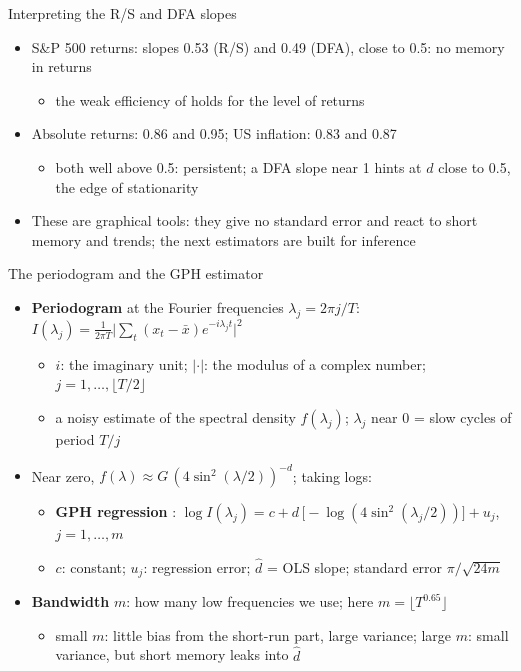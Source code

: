\begin{frame}{Interpreting the R/S and DFA slopes}
\itemsize{\small}
\begin{itemize}
    \item S\&P 500 returns: slopes 0.53 (R/S) and 0.49 (DFA), close to 0.5: no memory in returns
    \begin{itemize}
        \item the weak efficiency of  holds for the level of returns
    \end{itemize}
    \item Absolute returns: 0.86 and 0.95; US inflation: 0.83 and 0.87
    \begin{itemize}
        \item both well above 0.5: persistent; a DFA slope near 1 hints at $d$ close to 0.5, the edge of stationarity
    \end{itemize}
    \item These are graphical tools: they give no standard error and react to short memory and trends; the next estimators are built for inference
\end{itemize}
\end{frame}

\begin{frame}{The periodogram and the GPH estimator}
\itemsize{\small}
\begin{itemize}
    \item \textbf{Periodogram} at the Fourier frequencies $\lambda_j = 2\pi j/T$: $I(\lambda_j) = \frac{1}{2\pi T}\bigl|\sum_t (x_t - \bar x)e^{-i\lambda_j t}\bigr|^2$
    \begin{itemize}
        \item $i$: the imaginary unit; $|\cdot|$: the modulus of a complex number; $j = 1, \dots, \lfloor T/2\rfloor$
        \item a noisy estimate of the spectral density $f(\lambda_j)$; $\lambda_j$ near 0 = slow cycles of period $T/j$
    \end{itemize}
    \item Near zero, $f(\lambda) \approx G\,(4\sin^2(\lambda/2))^{-d}$; taking logs:
    \begin{itemize}
        \item \textbf{GPH regression} : $\log I(\lambda_j) = c + d\,\bigl[-\log(4\sin^2(\lambda_j/2))\bigr] + u_j$, $j = 1, \dots, m$
        \item $c$: constant; $u_j$: regression error; $\hat d$ = OLS slope; standard error $\pi/\sqrt{24m}$
    \end{itemize}
    \item \textbf{Bandwidth} $m$: how many low frequencies we use; here $m = \lfloor T^{0.65}\rfloor$
    \begin{itemize}
        \item small $m$: little bias from the short-run part, large variance; large $m$: small variance, but short memory leaks into $\hat d$
    \end{itemize}
\end{itemize}
\end{frame}

